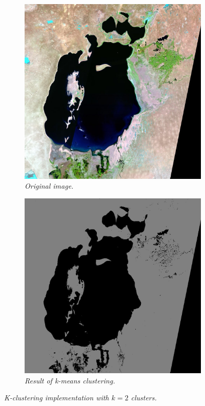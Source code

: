 \begin{figure}[H]
    \centering
    \begin{subfigure}[b]{.45\textwidth}
        \includegraphics[width=\textwidth]{../img/1987.jpg}
        \caption{\emph{Original image.\\}}
    \end{subfigure}
    \begin{subfigure}[b]{.45\textwidth}
        \includegraphics[width=\textwidth]{../img/2clusters.jpg}
        \caption{\emph{Result of k-means clustering.}}
    \end{subfigure}
    \caption{\emph{K-clustering implementation with $k=2$ clusters.}}
    \label{fig:plugin}
\end{figure}
